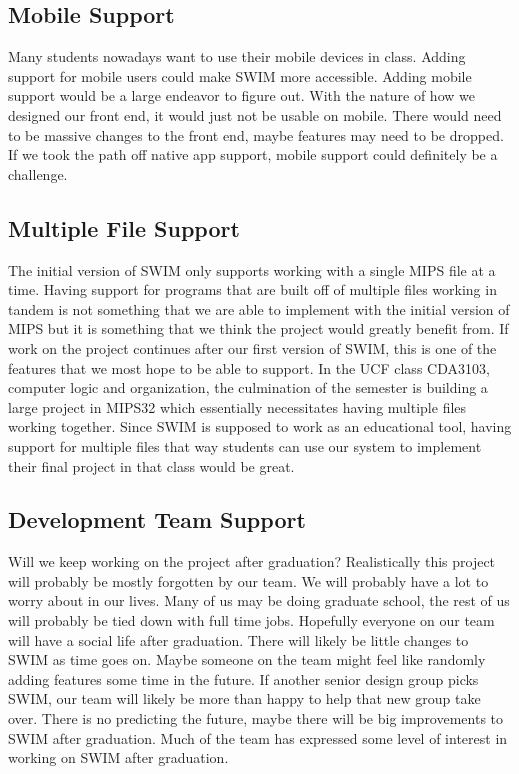 \documentclass[
    parskip=half,
    fontsize=12pt,
    titlepage=firstiscover,
    toc=bibliography,
    numbers=endperiod
]{scrartcl}
\begin{document}
\subsection{Mobile Support}

Many students nowadays want to use their mobile devices in class. Adding
support for mobile users could make SWIM more accessible. Adding mobile
support would be a large endeavor to figure out. With the nature of how
we designed our front end, it would just not be usable on mobile. There
would need to be massive changes to the front end, maybe features may
need to be dropped. If we took the path off native app support, mobile
support could definitely be a challenge.

\subsection{Multiple File Support}

The initial version of SWIM only supports working with a single MIPS
file at a time. Having support for programs that are built off of
multiple files working in tandem is not something that we are able to
implement with the initial version of MIPS but it is something that we
think the project would greatly benefit from. If work on the project
continues after our first version of SWIM, this is one of the features
that we most hope to be able to support. In the UCF class CDA3103,
computer logic and organization, the culmination of the semester is
building a large project in MIPS32 which essentially necessitates having
multiple files working together. Since SWIM is supposed to work as an
educational tool, having support for multiple files that way students
can use our system to implement their final project in that class would
be great.

\subsection{Development Team Support}

Will we keep working on the project after graduation? Realistically this
project will probably be mostly forgotten by our team. We will probably
have a lot to worry about in our lives. Many of us may be doing graduate
school, the rest of us will probably be tied down with full time jobs.
Hopefully everyone on our team will have a social life after graduation.
There will likely be little changes to SWIM as time goes on. Maybe
someone on the team might feel like randomly adding features some time
in the future. If another senior design group picks SWIM, our team will
likely be more than happy to help that new group take over. There is no
predicting the future, maybe there will be big improvements to SWIM
after graduation. Much of the team has expressed some level of interest
in working on SWIM after graduation.


\printbibliography
\end{document}
